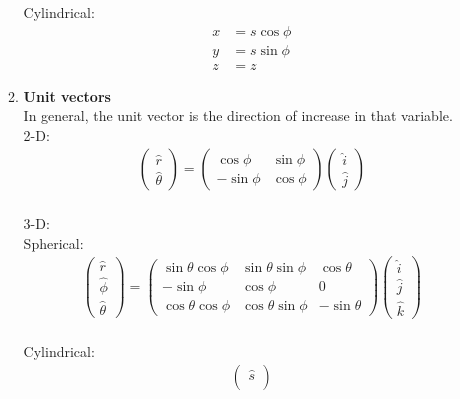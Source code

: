 \documentclass[12pt, oneside]{book}
\begin{document}
\begin{itemize}
\begin{enumerate}
Cylindrical:\\
\begin{align}
	x&=s\cos \phi \\
	y&=s\sin \phi \\
	z&=z 
\end{align}
   
   \item \textbf{Unit vectors} \\
   In general, the unit vector is the direction of increase in that variable.\\
   2-D: 
   \begin{gather}
   	\begin{pmatrix}
   		\hat{r}\\
   		\hat{\theta}
   	\end{pmatrix}
   =
   \begin{pmatrix}
   	\cos\phi & \sin\phi \\
   	-\sin\phi& \cos\phi
   \end{pmatrix}
   \begin{pmatrix}
   	\hat{i}\\
   	\hat{j}
   \end{pmatrix}
   \end{gather}\\
3-D:\\
Spherical:\\
   \begin{gather}
   	\begin{pmatrix}
   		\hat{r}\\
   		\hat{\phi}\\
   		\hat{\theta}
   	\end{pmatrix}
   =
   \begin{pmatrix}
   	\sin\theta\cos\phi & \sin\theta\sin\phi & \cos\theta \\
   	-\sin\phi          & \cos\phi           & 0          \\
   	\cos\theta\cos\phi & \cos\theta\sin\phi & -\sin\theta  
   \end{pmatrix} 
\begin{pmatrix}
	\hat{i}\\
	\hat{j}\\
	\hat{k}
\end{pmatrix}
   \end{gather} \\
Cylindrical:\\
\begin{gather}
   	\begin{pmatrix}
	\hat{s}\\

\end{pmatrix}
\end{gather}
\end{enumerate}
\end{itemize}
\end{document}
